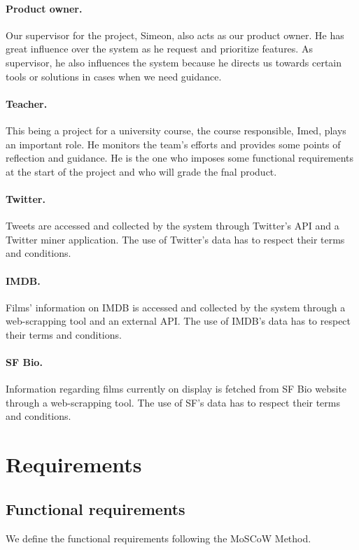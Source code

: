 \documentclass{article}
\begin{document}
\paragraph{Product owner.} Our supervisor for the project, Simeon, also acts as our product owner. He has great influence over the system as he request and prioritize features. 
As supervisor, he also influences the system because he directs us towards certain tools or solutions in cases when we need guidance.

\paragraph{Teacher.}
This being a project for a university course, the course responsible, Imed, plays an important role. He monitors the team's efforts and provides some points of reflection and guidance. He is the one who imposes some functional requirements at the start of the project and who will grade the fnal product.

\paragraph{Twitter.}
Tweets are accessed and collected by the system through Twitter's API and a Twitter miner application. The use of Twitter's data has to respect their terms and conditions.

\paragraph{IMDB.}
Films' information on IMDB is accessed and collected by the system through a web-scrapping tool and an external API. The use of IMDB's data has to respect their terms and conditions.

\paragraph{SF Bio.}
Information regarding films currently on display is fetched from SF Bio website through a web-scrapping tool. The use of SF's data has to respect their terms and conditions.


\section{Requirements}

\subsection{Functional requirements}
We define the functional requirements following the MoSCoW Method. 
\end{document}

